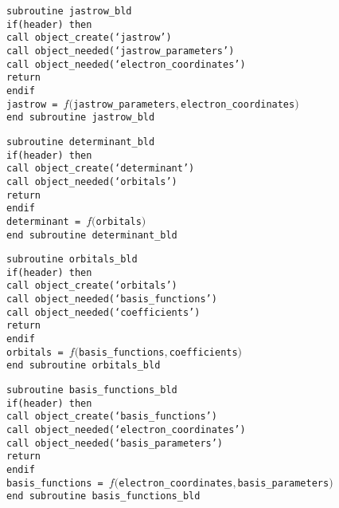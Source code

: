\documentclass[letter,11pt]{article}
\begin{document}
\vspace{0.5cm}
\noindent
{\tt subroutine jastrow_bld\\
if(header) then\\
\phantom{xx} call object_create(`jastrow')\\
\phantom{xx} call object_needed(`jastrow_parameters')\\
\phantom{xx} call object_needed(`electron_coordinates')\\
\phantom{xx} return\\
endif\\
jastrow  = $f(${\tt jastrow_parameters}$,${\tt electron_coordinates}$)$\\
end subroutine jastrow_bld}

\vspace{0.5cm}
\noindent
{\tt subroutine determinant_bld\\
if(header) then\\
\phantom{xx} call object_create(`determinant')\\
\phantom{xx} call object_needed(`orbitals')\\
\phantom{xx} return\\
endif\\
determinant  = $f(${\tt orbitals}$)$\\
end subroutine determinant_bld}

\vspace{0.5cm}
\noindent
{\tt subroutine orbitals_bld\\
if(header) then\\
\phantom{xx} call object_create(`orbitals')\\
\phantom{xx} call object_needed(`basis_functions')\\
\phantom{xx} call object_needed(`coefficients')\\
\phantom{xx} return\\
endif\\
orbitals  = $f(${\tt basis_functions}$,${\tt coefficients}$)$\\
end subroutine orbitals_bld}

\vspace{0.5cm}
\noindent
{\tt subroutine basis_functions_bld\\
if(header) then\\
\phantom{xx} call object_create(`basis_functions')\\
\phantom{xx} call object_needed(`electron_coordinates')\\
\phantom{xx} call object_needed(`basis_parameters')\\
\phantom{xx} return\\
endif\\
basis_functions  = $f(${\tt electron_coordinates}$,${\tt basis_parameters}$)$\\
end subroutine basis_functions_bld}
\end{document}

